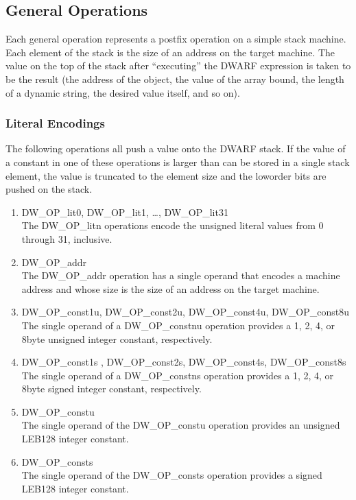 \subsection{General Operations}
\label{chap:generaloperations}
Each general operation represents a postfix operation on
a simple stack machine. Each element of the stack is the
size of an address on the target machine. The value on the
top of the stack after ``executing'' the DWARF expression
is taken to be the result (the address of the object, the
value of the array bound, the length of a dynamic string,
the desired value itself, and so on).

\subsubsection{Literal Encodings}
\label{chap:literalencodings}
The following operations all push a value onto the DWARF
stack. If the value of a constant in one of these operations
is larger than can be stored in a single stack element, the
value is truncated to the element size and the low\dash order bits
are pushed on the stack.

\begin{enumerate}[1]
\item DW\-\_OP\-\_lit0, DW\-\_OP\-\_lit1, \dots, DW\-\_OP\-\_lit31 \\
The DW\-\_OP\-\_litn operations encode the unsigned literal values
from 0 through 31, inclusive.

\item DW\-\_OP\-\_addr \\
The DW\-\_OP\-\_addr operation has a single operand that encodes
a machine address and whose size is the size of an address
on the target machine.

\item DW\-\_OP\-\_const1u, DW\-\_OP\-\_const2u, DW\-\_OP\-\_const4u, DW\-\_OP\-\_const8u \\
The single operand of a DW\-\_OP\-\_constnu operation provides a 1,
2, 4, or 8\dash byte unsigned integer constant, respectively.

\item DW\-\_OP\-\_const1s , DW\-\_OP\-\_const2s, DW\-\_OP\-\_const4s, DW\-\_OP\-\_const8s \\
The single operand of a DW\-\_OP\-\_constns operation provides a 1,
2, 4, or 8\dash byte signed integer constant, respectively.

\item DW\-\_OP\-\_constu \\
The single operand of the DW\-\_OP\-\_constu operation provides
an unsigned LEB128 integer constant.

\item DW\-\_OP\-\_consts \\
The single operand of the DW\-\_OP\-\_consts operation provides
a signed LEB128 integer constant.

\end{enumerate}


